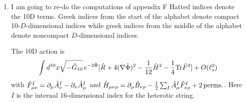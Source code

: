 \documentclass[11pt, class=article, crop=false]{standalone}
\begin{document}
\begin{enumerate}
\[\begin{aligned}
{			+ \pi R^2 \frac{\tau_1^2}{\tau_2} n^2
			+ 2 \pi i (m + q^I + \frac12 n Y^I) n  \tau_1}\\
			&= e^{- n^2 \pi R^2 \tau_2} \frac{\sqrt{\tau_2}}{R} \sum_{m}
			 e^{-\frac{\pi \tau_2}{R^2} (m + Y^I (q^I + \frac12 n Y^I) )^2 
			+ 2 \pi i (m + q^I + \frac12 n Y^I) n  \tau_1}\\
		\end{aligned}
		\]
		Together with the other terms this gives us
		\[
		\begin{aligned}
			&\frac{1}{\eta \bar \eta^{17}} \sum_{n, m, q^I} q^{\frac12 (q^I + n Y^I)^2}  e^{- n^2 \pi R^2 \tau_2}  e^{-\frac{\pi \tau_2}{R^2} (m + Y^I (q^I + \frac12 n Y^I) )^2 
			+ 2 \pi i (m + q^I + \frac12 n Y^I) n  \tau_1 } \\
			&= \frac{1}{\eta \bar \eta^{17}} \sum_{n, m, q^I} q^{\frac12 (q^I + n Y^I)^2} q^{\frac14 (\frac{1}{R} (m - Y^I (q^I + \frac12 n Y^I)) + n R)^2} \bar q^{\frac14 ( \frac{1}{R} (m - Y^I (q^I + \frac12 n Y^I)) - n R)^2}
		\end{aligned}
		\]
		where I've flipped $m \to -m$ at the end there. We get momenta 
		\[
		\begin{aligned}
			k_L &= \frac{1}{R}(m - q^I Y^I - \frac12 n Y^I Y^I) + n R = \frac{m}{R} + n (R - \frac12 Y^I Y^I) - q^I Y^I \\
			k_R &= \frac{1}{R}(m - q^I Y^I - \frac12 n Y^I Y^I ) - n R = \frac{m}{R} - n (R + \frac12 Y^I Y^I) - q^I Y^I\\
			k_R^I &= q^I + n Y^I 
		\end{aligned}
		\]
		consistent with Polchinski with $m \leftarrow n_m, n \leftarrow w^n, Y^I \leftarrow R A^I$ and $\alpha' = 0$ \textbf{(might be off by a factor of $2$ for $k_R^I$ rel. to Polchinski but I think I'm consistent with Ginsparg)}. We only care about the $SO(1,1, \ZZ)$ T-duality group coming from the compact $x^9$. This does not act on the $Y^I$ as far as I can see \textbf{CHECK}
		
		The $\mathrm{SO}(16, \ZZ)$ on the other hand acts on the $Y^I$ as in the standard vector representation. 
	
	
	\item I am going to re-do the computations of appendix F Hatted indices denote the 10D terms. Greek indices from the start of the alphabet denote compact 10-$D$-dimensional indices while greek indices from the middle of the alphabet denote noncompact $D$-dimensional indices.
	
	The 10D action is
	\[
		\int d^{10} x \sqrt{-\hat G_{10}} \,  e^{-2\hat \Phi} [\hat R + 4 (\nabla \hat \Phi)^2 - \frac{1}{12} \hat H^2 - \frac14 \mathrm{Tr} \hat F^2] + O(\ell_s^2)
	\]
	with $\hat F^I_{\mu \nu} = \partial_\mu \hat A^I_\nu - \partial_\nu \hat A^I_\mu$ and $\hat H_{\mu \nu \rho} = \partial_\mu \hat B_{\nu \rho} - \frac12 \sum_I \hat A_{\mu}^I \hat  F^I_{\nu \rho} + 2 \,\mathrm{perms.} $. Here $I$ is the internal $16$-dimensional index for the heterotic string. 
	

\end{enumerate}
\end{document}
